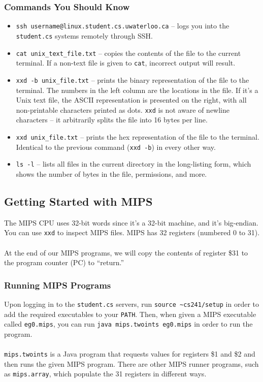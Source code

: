 \documentclass[]{article}
\theoremstyle{definition}
\begin{document}
			\subsubsection{Commands You Should Know}
				\begin{itemize}
					\item \verb+ssh username@linux.student.cs.uwaterloo.ca+ -- logs you into the \verb+student.cs+ systems remotely through SSH.
					\item \verb+cat unix_text_file.txt+ -- copies the contents of the file to the current terminal. If a non-text file is given to \verb+cat+, incorrect output will result.
					\item \verb+xxd -b unix_file.txt+ -- prints the binary representation of the file to the terminal. The numbers in the left column are the locations in the file. If it's a Unix text file, the ASCII representation is presented on the right, with all non-printable characters printed as dots. \verb+xxd+ is not aware of newline characters -- it arbitrarily splits the file into 16 bytes per line.
					\item \verb+xxd unix_file.txt+ -- prints the hex representation of the file to the terminal. Identical to the previous command (\verb+xxd -b+) in every other way.
					\item \verb+ls -l+ -- lists all files in the current directory in the long-listing form, which shows the number of bytes in the file, permissions, and more.
				\end{itemize}
		\subsection{Getting Started with MIPS}
			The MIPS CPU uses 32-bit words since it's a 32-bit machine, and it's big-endian. You can use \verb+xxd+ to inspect MIPS files. MIPS has 32 registers (numbered 0 to 31).
			\\ \\
			At the end of our MIPS programs, we will copy the contents of register \$31 to the program counter (PC) to ``return.''

			\subsubsection{Running MIPS Programs}
				Upon logging in to the \verb+student.cs+ servers, run \verb+source ~cs241/setup+ in order to add the required executables to your \verb+PATH+. Then, when given a MIPS executable called \verb+eg0.mips+, you can run \verb+java mips.twoints eg0.mips+ in order to run the program.
				\\ \\
				\verb+mips.twoints+ is a Java program that requests values for registers \$1 and \$2 and then runs the given MIPS program. There are other MIPS runner programs, such as \verb+mips.array+, which populate the 31 registers in different ways.
\end{document}
